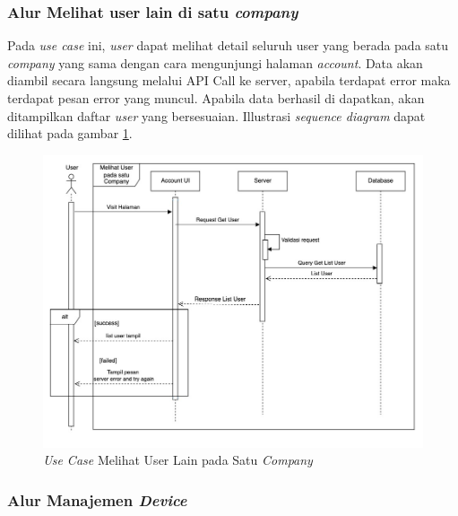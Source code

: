 \pagebreak

\subsubsection{Alur Melihat user lain di satu \textit{company}}

Pada \textit{use case} ini, \textit{user} dapat melihat detail seluruh user yang berada pada satu \textit{company} yang sama dengan cara mengunjungi halaman \textit{account}. Data akan diambil secara langsung melalui API Call ke server, apabila terdapat error maka terdapat pesan error yang muncul. Apabila data berhasil di dapatkan, akan ditampilkan daftar \textit{user} yang bersesuaian. Illustrasi \textit{sequence diagram} dapat dilihat pada gambar \ref{fig:usecase-07}.


\begin{figure}[ht]
  \centering
  \includegraphics[width=1\textwidth]{resources/chapter-3/usecase/uc-07.jpg}
  \caption{\textit{Use Case} Melihat User Lain pada Satu \textit{Company}}
  \label{fig:usecase-07}
\end{figure}

\pagebreak

\subsubsection{Alur Manajemen \textit{Device}}

